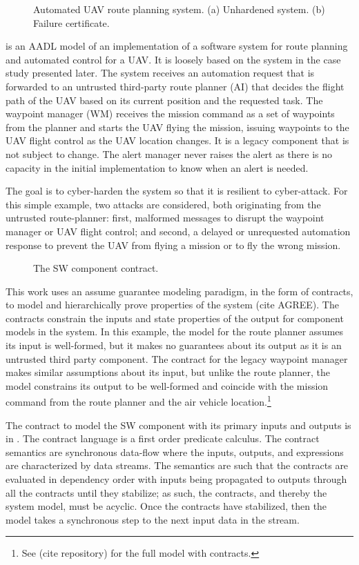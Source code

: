\begin{figure*}
\caption{Automated UAV route planning system. (a) Unhardened system. (b) Failure certificate.}
\label{fig:example}
\end{figure*}

 is an AADL model of an implementation of a software system for route planning and automated control for a UAV. It is loosely based on the system in the case study presented later. The system receives an automation request that is forwarded to an untrusted third-party route planner (AI) that decides the flight path of the UAV based on its current position and the requested task. The waypoint manager (WM) receives the mission command as a set of waypoints from the planner and starts the UAV flying the mission, issuing waypoints to the UAV flight control as the UAV location changes. It is a legacy component that is not subject to change. The alert manager never raises the alert as there is no capacity in the initial implementation to know when an alert is needed.

The goal is to cyber-harden the system so that it is resilient to cyber-attack. For this simple example, two attacks are considered, both originating from the untrusted route-planner: first, malformed messages to disrupt the waypoint manager or UAV flight control; and second, a delayed or unrequested automation response to prevent the UAV from flying a mission or to fly the wrong mission.

\begin{figure}
  \caption{The SW component contract.}
  \label{fig:sw}
\end{figure}

This work uses an assume guarantee modeling paradigm, in the form of contracts, to model and hierarchically prove properties of the system (cite AGREE). The contracts constrain the inputs and state properties of the output for component models in the system. In this example, the model for the route planner assumes its input is well-formed, but it makes no guarantees about its output as it is an untrusted third party component. The contract for the legacy waypoint manager makes similar assumptions about its input, but unlike the route planner, the model constrains its output to be well-formed and coincide with the mission command from the route planner and the air vehicle location.\footnote{See (cite repository) for the full model with contracts.}

The contract to model the SW component with its primary inputs and outputs is in . The contract language is a first order predicate calculus. The contract semantics are synchronous data-flow where the inputs, outputs, and expressions are characterized by data streams. The semantics are such that the contracts are evaluated in dependency order with inputs being propagated to outputs through all the contracts until they stabilize; as such, the contracts, and thereby the system model, must be acyclic. Once the contracts have stabilized, then the model takes a synchronous step to the next input data in the stream.  

